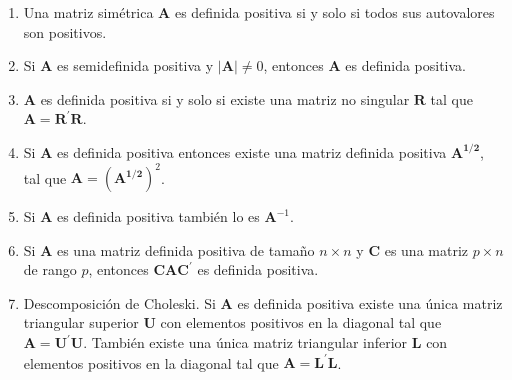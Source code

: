 \documentclass[
  a4paper,
  oneside]{scrbook}
\theoremstyle{definition}
\theoremstyle{definition}
\theoremstyle{definition}
\theoremstyle{definition}
\theoremstyle{remark}
\begin{document}
\begin{enumerate}
\def\labelenumi{\arabic{enumi}.}
\item
  Una matriz simétrica \(\bm{A}\) es definida positiva si y solo si
  todos sus autovalores son positivos.
\item
  Si \(\bm{A}\) es semidefinida positiva y \(\left|\bm{A}\right|\neq 0\),
  entonces \(\bm{A}\) es definida positiva.
\item
  \(\bm{A}\) es definida positiva si y solo si existe una matriz no
  singular \(\bm{R}\) tal que \(\bm{A}=\bm{R}^\prime{}\bm{R}\).
\item
  Si \(\bm{A}\) es definida positiva entonces existe una matriz definida
  positiva \(\bm{A^{1/2}}\), tal que \(\bm{A}=(\bm{A^{1/2}})^2\).
\item
  Si \(\bm{A}\) es definida positiva también lo es \(\bm{A}^{-1}\).
\item
  Si \(\bm{A}\) es una matriz definida positiva de tamaño \(n\times n\) y
  \(\bm{C}\) es una matriz \(p\times n\) de rango \(p\), entonces
  \(\bm{C}\bm{A}\bm{C}^\prime{}\) es definida positiva.
\item
  Descomposición de Choleski. Si \(\bm{A}\) es definida positiva existe
  una única matriz triangular superior \(\bm{U}\) con elementos
  positivos en la diagonal tal que \(\bm{A}=\bm{U}^\prime{}\bm{U}\).
  También existe una única matriz triangular inferior \(\bm{L}\) con
  elementos positivos en la diagonal tal que
  \(\bm{A}=\bm{L}^\prime{}\bm{L}\).
\end{enumerate}

\nocite{*}


\printindex
\end{document}
